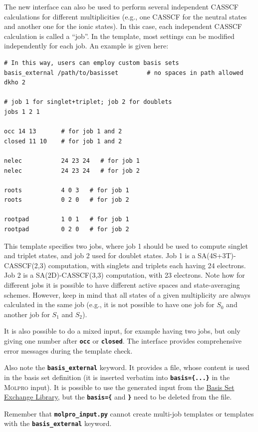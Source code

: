 \documentclass[a4paper,10pt,DIV=15,openany]{scrbook}
\newcommand{\link}[2]{\href{#1}{#2}}
\newcommand{\ttt}[1]{\textbf{\texttt{#1}}}
\newenvironment{example}{
  \setlength{\OuterFrameSep}{3pt}
  \vspace{0mm}
  \definecolor{shadecolor}{HTML}{E4F4FF}
  \begin{shaded}
}{
  \end{shaded}
}
\begin{document}
The new interface can also be used to perform several independent CASSCF calculations for different multiplicities (e.g., one CASSCF for the neutral states and another one for the ionic states).
In this case, each independent CASSCF calculation is called a ``job''.
In the template, most settings can be modified independently for each job.
An example is given here:
\begin{example}
  \begin{verbatim}
# In this way, users can employ custom basis sets
basis_external /path/to/basisset        # no spaces in path allowed
dkho 2

# job 1 for singlet+triplet; job 2 for doublets
jobs 1 2 1

occ 14 13       # for job 1 and 2
closed 11 10    # for job 1 and 2

nelec           24 23 24   # for job 1
nelec           24 23 24   # for job 2

roots           4 0 3   # for job 1
roots           0 2 0   # for job 2

rootpad         1 0 1   # for job 1
rootpad         0 2 0   # for job 2
\end{verbatim}
\end{example}
This template specifies two jobs, where job 1 should be used to compute singlet and triplet states, and job 2 used for doublet states.
Job 1 is a SA(4S+3T)-CASSCF(2,3) computation, with singlets and triplets each having 24 electrons.
Job 2 is a SA(2D)-CASSCF(3,3) computation, with 23 electrons.
Note how for different jobs it is possible to have different active spaces and state-averaging schemes.
However, keep in mind that all states of a given multiplicity are always calculated in the same job (e.g., it is not possible to have one job for $S_0$ and another job for $S_1$ and $S_2$).

It is also possible to do a mixed input, for example having two jobs, but only giving one number after \ttt{occ} or \ttt{closed}.
The interface provides comprehensive error messages during the template check.

Also note the \ttt{basis\_external} keyword. It provides a file, whose content is used in the basis set definition (it is inserted verbatim into \ttt{basis=\{...\}} in the \textsc{Molpro} input).
It is possible to use the generated input from the \link{https://bse.pnl.gov/bse/portal}{Basis Set Exchange Library}, but the \ttt{basis=\{} and \ttt{\}} need to be deleted from the file.

Remember that \ttt{molpro\_input.py} cannot create multi-job templates or templates with the \ttt{basis\_external} keyword.
\end{document}

